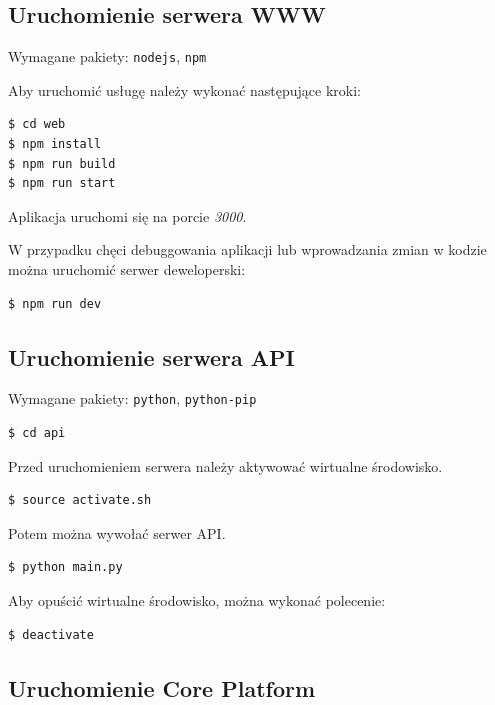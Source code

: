 \documentclass{article}
\begin{document}
\subsection{Uruchomienie serwera WWW}

Wymagane pakiety: \texttt{nodejs}, \texttt{npm}

\noindent Aby uruchomić usługę należy wykonać następujące kroki:

\begin{lstlisting}
$ cd web
$ npm install
$ npm run build
$ npm run start
\end{lstlisting}

\noindent Aplikacja uruchomi się na porcie \textit{3000}.

\noindent W przypadku chęci debuggowania aplikacji lub wprowadzania zmian w kodzie można uruchomić serwer deweloperski:

\begin{lstlisting}
$ npm run dev
\end{lstlisting}

\subsection{Uruchomienie serwera API}

Wymagane pakiety: \texttt{python}, \texttt{python-pip}

\begin{lstlisting}
$ cd api
\end{lstlisting}

\noindent Przed uruchomieniem serwera należy aktywować wirtualne środowisko.

\begin{lstlisting}
$ source activate.sh
\end{lstlisting}

\noindent Potem można wywołać serwer API.

\begin{lstlisting}
$ python main.py
\end{lstlisting}

\noindent Aby opuścić wirtualne środowisko, można wykonać polecenie:

\begin{lstlisting}
$ deactivate
\end{lstlisting}

\subsection{Uruchomienie Core Platform}
\end{document}
